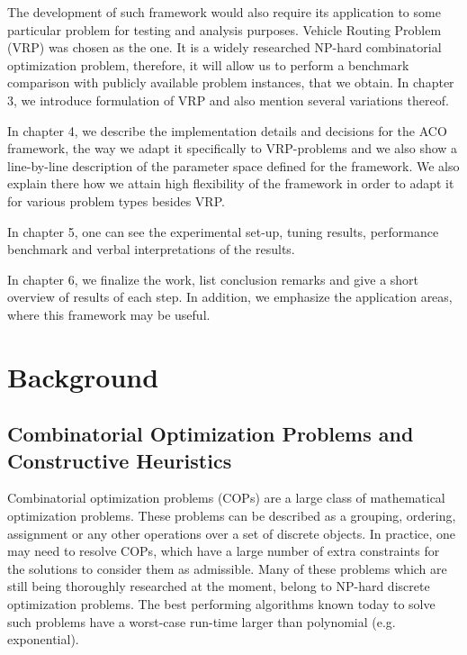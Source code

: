 \documentclass[12pt,a4paper,oneside]{book}
\begin{document}
The development of such framework would also require its application to some particular problem for testing and analysis purposes. Vehicle Routing Problem (VRP) was chosen as the one. It is a widely researched NP-hard combinatorial optimization problem, therefore, it will allow us to perform a benchmark comparison with publicly available problem instances, that we obtain. In chapter 3, we introduce formulation of VRP and also mention several variations thereof.

In chapter 4, we describe the implementation details and decisions for the ACO framework, the way we adapt it specifically to VRP-problems and we also show a line-by-line description of the parameter space defined for the framework. We also explain there how we attain high flexibility of the framework in order to adapt it for various problem types besides VRP.

In chapter 5, one can see the experimental set-up, tuning results, performance benchmark and verbal interpretations of the results.

In chapter 6, we finalize the work, list conclusion remarks and give a short overview of results of each step. In addition, we emphasize the application areas, where this framework may be useful. 

\chapter{Background}

\section{Combinatorial Optimization Problems and Constructive Heuristics}

Combinatorial optimization problems (COPs) are a large class of mathematical optimization problems. These problems can be described as a grouping, ordering, assignment or any other operations over a set of discrete objects. In practice, one may need to resolve COPs, which have a large number of extra constraints for the solutions to consider them as admissible. Many of these problems which are still being thoroughly researched at the moment, belong to NP-hard discrete optimization problems. The best performing algorithms known today to solve such problems have a worst-case run-time larger than polynomial (e.g. exponential).

\noindent{}
\end{document}
